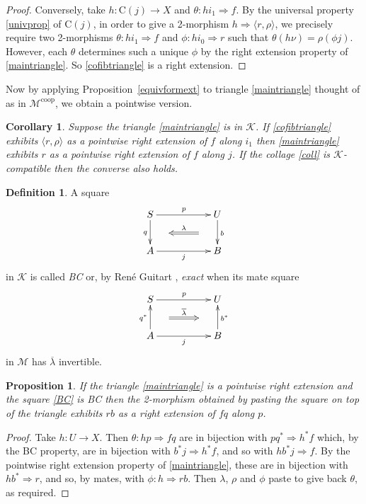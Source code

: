 \documentclass[a4paper,12pt]{article}
\newtheorem{proposition}[theorem]{Proposition}
\newtheorem{corollary}[theorem]{Corollary}
\theoremstyle{definition}
\newtheorem*{Definition}{Definition}%
\theoremstyle{fact}
\theoremstyle{genquest}
\theoremstyle{step}
\newcommand{\lra}{\longrightarrow}
\newcommand{\Lra}{\Longrightarrow}
\def\CK{{\mathscr K}}
\def\CM{{\mathscr M}}
\begin{document}
{\begin{proof}
Conversely, take $h:\mathrm{C}(j) \lra X$ and $\theta : hi_1\Lra f$. By the universal property \eqref{univprop} of $\mathrm{C}(j)$,
in order to give a 2-morphism $h \Lra \langle r, \rho \rangle $, we precisely require two 2-morphisms
$\theta : hi_1\Lra f$ and $\phi : hi_0 \Lra r$ such that $\theta (h\nu) = \rho (\phi j)$. However, each $\theta$
determines such a unique $\phi$ by the right extension property of \eqref{maintriangle}. So \eqref{cofibtriangle}
is a right extension.   
\end{proof}

Now by applying Proposition~\ref{equivformext} to triangle \eqref{maintriangle} thought of as in $\CM^{\mathrm{coop}}$, we obtain a pointwise version.
 
\begin{corollary}
Suppose the triangle \eqref{maintriangle} is in $\CK$. If \eqref{cofibtriangle} exhibits $\langle r, \rho \rangle$ as a pointwise right extension of $f$ along $i_1$ then \eqref{maintriangle} exhibits $r$ as a pointwise right extension of $f$ along $j$.
If the collage \eqref{coll} is $\CK$-compatible then the converse also holds. 
\end{corollary}

\begin{Definition}
A square 
\begin{equation}\label{BC}
\begin{aligned}
\xymatrix{
S \ar[d]_{q}^(0.5){\phantom{aaa}}="1" \ar[rr]^{p}  && U \ar[d]^{b}_(0.5){\phantom{aaa}}="2" \ar@{<=}"1";"2"^-{\lambda}
\\
A \ar[rr]_-{j} && B 
}
\end{aligned}
\end{equation}
in $\CK$ is called {\em BC} or, by Ren\'e Guitart \cite{Guitart1980}, {\em exact} when its mate square 
\begin{equation}\label{BCmate}
\begin{aligned}
\xymatrix{
S \ar[rr]^{p}   && U 
\\
A \ar[rr]_-{j}  \ar[u]^{q^*}_(0.5){\phantom{aaa}}="2" && B \ar[u]_{b^*}^(0.5){\phantom{aaa}}="1" \ar@{<=}"1";"2"_-{\overline{\lambda}}  
}
\end{aligned}
\end{equation}
in $\CM$ has $\overline{\lambda}$ invertible.
\end{Definition}

\begin{proposition}
If the triangle \eqref{maintriangle} is a pointwise right extension and the square \eqref{BC} is BC then the
2-morphism obtained by pasting the square on top of the triangle exhibits $rb$ as a right extension
of $fq$ along $p$. 
\end{proposition}
\begin{proof}
Take $h:U\lra X$. Then $\theta : hp \Lra fq$ are in bijection with $pq^*\Lra h^*f$ which, by the BC property,
are in bijection with $b^*j\Lra h^*f$, and so with $hb^*j\Lra f$. By the pointwise right extension property of \eqref{maintriangle}, these are in bijection with $hb^* \Lra r$, and so, by mates, with $\phi : h \Lra rb$. 
Then $\lambda$, $\rho$ and $\phi$ paste to give back $\theta$, as required.  
\end{proof}

}
\end{document}
